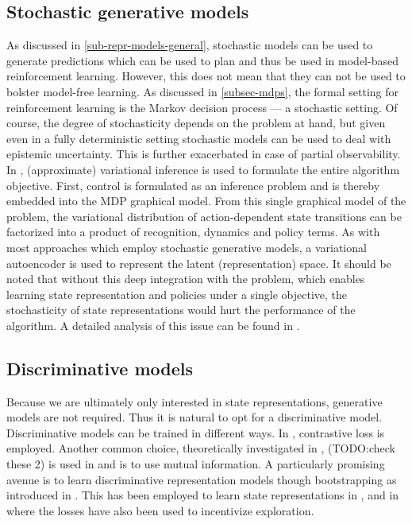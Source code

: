 \subsection{Stochastic generative models}
As discussed in \ref{sub-repr-models-general}, stochastic models can be used to generate 
predictions which can be used to plan and thus be used in model-based reinforcement learning.
However, this does not mean that they can not be used to bolster model-free learning.
As discussed in \ref{subsec-mdps}, the formal setting for reinforcement learning is 
the Markov decision process --- a stochastic setting.
Of course, the degree of stochasticity depends on the problem at hand,
but given even in a fully deterministic setting stochastic models
can be used to deal with epistemic uncertainty.
This is further exacerbated in case of partial observability.
In \cite{slac}, (approximate) variational inference is used to formulate the entire algorithm objective.
First, control is formulated as an inference problem and is thereby embedded into the
MDP graphical model. From this single graphical model of the problem,
the variational distribution of action-dependent state transitions can be factorized
into a product of recognition, dynamics and policy terms.
As with most approaches which employ stochastic generative models, 
a variational autoencoder is used to represent the latent (representation) space.
It should be noted that without this deep integration with the problem,
which enables learning state representation and policies under a single objective,
the stochasticity of state representations would hurt the performance of the algorithm.
A detailed analysis of this issue can be found in \cite{sac+ae}.



\subsection{Discriminative models}
Because we are ultimately only interested in state representations, generative models are not required.
Thus it is natural to opt for a discriminative model.
Discriminative models can be trained in different ways.
In \cite{curl}, contrastive loss is employed.
Another common choice, theoretically investigated in \cite{rakelly2021mutual},
(TODO:check these 2)
is used in \cite{anand2019unsupervised} and \cite{mazoure2020deep} is to use mutual information.
A particularly promising avenue is to learn discriminative representation models
though bootstrapping as introduced in \cite{grill2020bootstrap}.
This has been employed to learn state representations in \cite{schwarzer2020data}, and in \cite{merckling2022exploratory}
where the losses have also been used to incentivize exploration.

